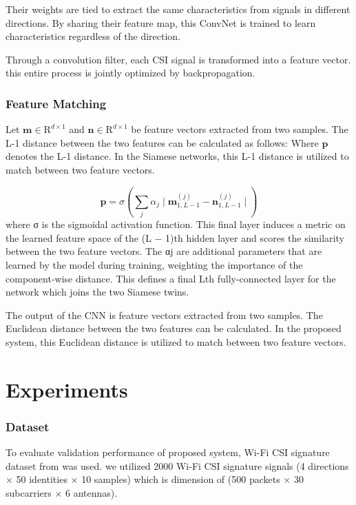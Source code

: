 \documentclass[runningheads]{llncs}
\begin{document}
Their weights are tied to extract the same characteristics from signals in different directions.
By sharing their feature map, this ConvNet is trained to learn characteristics regardless of the direction.

Through a convolution filter, each CSI signal is transformed into a feature vector. this entire process is jointly optimized by backpropagation.


\subsubsection{Feature Matching}

Let $\mathbf{m}\in{\mathrm{R}}^{d\times1}$ and $\mathbf{n}\in{\mathrm{R}}^{d\times1}$ be feature vectors extracted from two samples.
The L-1 distance between the two features can be calculated as  follows:
Where $\mathbf{p}$ denotes the L-1 distance. In the Siamese networks, this L-1 distance is utilized to match between two feature vectors.

\begin{equation}
    \mathbf{p} = 
    \sigma(\sum_j\alpha_{j}\mid
    \mathbf{m}_{1,L-1}^{(j)} - 
    \mathbf{n}_{1,L-1}^{(j)}\mid)  
\end{equation}
where σ is the sigmoidal
activation function. This final layer induces a metric on the learned feature space of the (L − 1)th hidden layer and scores the similarity between the two feature vectors. The αj are additional parameters that are learned by the model during training, weighting the importance of the component-wise distance. This defines a final Lth fully-connected layer for the network which joins the two Siamese twins.

The output of the CNN is feature vectors extracted from two samples. The Euclidean distance between the two features can be calculated.
In the proposed system, this Euclidean distance is utilized to match between two feature vectors.


\section{Experiments}
\subsubsection{Dataset}
 To evaluate validation performance of proposed system, Wi-Fi CSI signature dataset from \cite{moon2017air} was used.
 we utilized 2000 Wi-Fi CSI signature signals (4 directions $\times$ 50 identities $\times$ 10 samples) which is dimension of (500 packets $\times$ 30 subcarriers $\times$ 6 antennas). 
 
\end{document}
